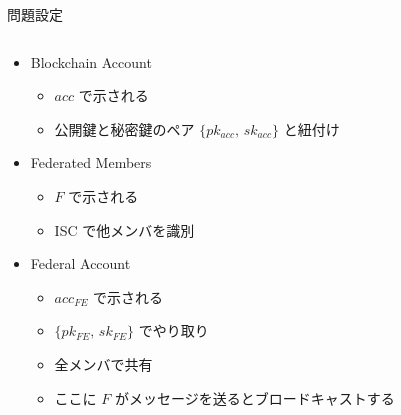 \documentclass[unicode,12pt,aspectratio=169, dvipdfmx]{beamer}
\begin{document}
    \begin{frame}{問題設定}
        \begin{columns}
            \begin{column}[T]{.7\linewidth}
                \begin{itemize}
                    \item Blockchain Account
                      \begin{itemize}
                        \item $acc$ で示される
                        \item 公開鍵と秘密鍵のペア $\{pk_{acc},\,sk_{acc}\}$ と紐付け
                      \end{itemize}
                    \item Federated Members
                      \begin{itemize}
                        \item $F$ で示される
                        \item ISC で他メンバを識別
                      \end{itemize}
                    \item Federal Account
                      \begin{itemize}
                        \item $acc_{FE}$ で示される
                        \item $\{pk_{FE},\,sk_{FE}\}$ でやり取り
                        \item 全メンバで共有
                        \item ここに $F$ がメッセージを送るとブロードキャストする
                      \end{itemize}
                  \end{itemize}
            \end{column}
        \end{columns}
    \end{frame}
\end{document}
